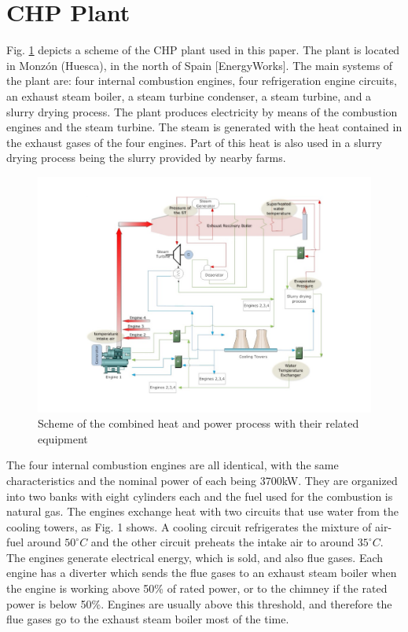\section{CHP Plant}
\label{plant}

Fig. \ref{figplant} depicts a scheme of the CHP plant used in this paper. The plant is located in Monz\'on (Huesca), in the north of Spain [EnergyWorks]. The main systems of the plant are: four internal combustion engines, four refrigeration engine circuits, an exhaust steam boiler, a steam turbine condenser, a steam turbine, and a slurry drying process. The plant produces electricity by means of the combustion engines and the steam turbine. The steam is generated with the heat contained in the exhaust gases of the four engines. Part of this heat is also used in a slurry drying process being the slurry provided by nearby farms.
\begin{figure}
\includegraphics[width=1\textwidth]{plant.pdf}
\caption{Scheme of the combined heat and power process with their related equipment}
\label{figplant}
\end{figure}

The four internal combustion engines are all identical, with the same characteristics and the nominal power of each being 3700kW. They are organized into two banks with eight cylinders each and the fuel used for the combustion is natural gas. The engines exchange heat with two circuits that use water from the cooling towers, as Fig. 1 shows. A cooling circuit refrigerates the mixture of air-fuel around $50^{\circ}C$ and the other circuit preheats the intake air to around $35^{\circ}C$. The engines generate electrical energy, which is sold,  and also flue gases. Each engine has a diverter which sends the flue gases to an exhaust steam boiler when the engine is working above 50\% of rated power, or to the chimney if the rated power is below 50\%. Engines are usually above this threshold, and therefore the flue gases go to the exhaust steam boiler most of the time. 

